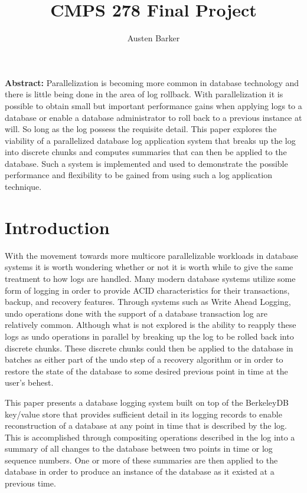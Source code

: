 \documentclass{article}
\begin{document}
\title{CMPS 278 Final Project}
\author{Austen Barker}
\maketitle


\textbf{Abstract:} 
Parallelization is becoming more common in database technology and there is little being done in the area of log rollback. With parallelization it is possible to obtain small but important performance gains when applying logs to a database or enable a database administrator to roll back to a previous instance at will. So long as the log possess the requisite detail. This paper explores the viability of a parallelized database log application system that breaks up the log into discrete chunks and computes summaries that can then be applied to the database. Such a system is implemented and used to demonstrate the possible performance and flexibility to be gained from using such a log application technique.

\section{Introduction}
With the movement towards more multicore parallelizable workloads in database systems it is worth wondering whether or not it is worth while to give the same treatment to how logs are handled. Many modern database systems utilize some form of logging in order to provide ACID characteristics for their transactions, backup, and recovery features. Through systems such as Write Ahead Logging, undo operations done with the support of a database transaction log are relatively common\cite{WAL}. Although what is not explored is the ability to reapply these logs as undo operations in parallel by breaking up the log to be rolled back into discrete chunks. These discrete chunks could then be applied to the database in batches as either part of the undo step of a recovery algorithm or in order to restore the state of the database to some desired previous point in time at the user's behest.

This paper presents a database logging system built on top of the BerkeleyDB key/value store that provides sufficient detail in its logging records to enable reconstruction of a database at any point in time that is described by the log. This is accomplished through compositing operations described in the log into a summary of all changes to the database between two points in time or log sequence numbers. One or more of these summaries are then applied to the database in order to produce an instance of the database as it existed at a previous time.
\end{document}
